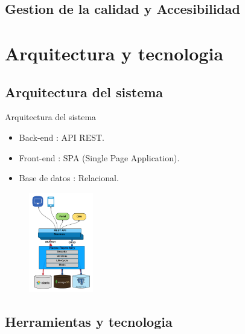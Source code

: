 \documentclass{beamer}
\begin{document}
\subsection{Gestion de la calidad y Accesibilidad}

\section{Arquitectura y tecnologia}

\subsection{Arquitectura del sistema}

	\begin{frame}{Arquitectura del sistema}
		\begin{itemize}
			\item {
				Back-end : API REST.
				
			}
			\item {
				Front-end : SPA (Single Page Application).
			}
			\item {
				Base de datos : Relacional.
				\hspace{1cm}
				
			}
		\end{itemize}
		
		
		\begin{figure}[h]
    \centering
    \includegraphics[width=0.25\textwidth]{images_latex/api}

\end{figure}
	
	\end{frame}

\subsection{Herramientas y tecnologia}
\end{document}
